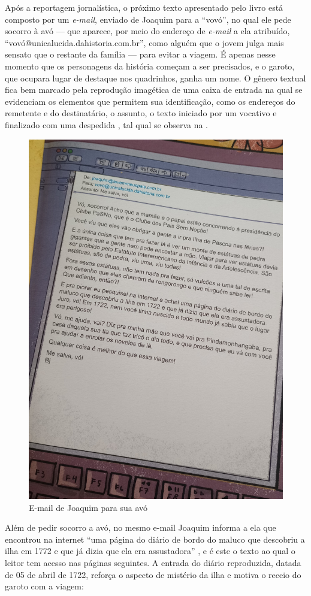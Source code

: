 \documentclass[portuguese]{textolivre}
\begin{document}
Após a reportagem jornalística, o próximo texto apresentado pelo livro está
composto por um \textit{e-mail}, enviado de Joaquim para a “vovó”, no qual ele
pede socorro à avó — que aparece, por meio do endereço de \textit{e-mail} a ela
atribuído, “vovó@unicalucida.dahistoria.com.br”, como alguém que o jovem julga
mais sensato que o restante da família — para evitar a viagem. É apenas nesse
momento que os personagens da história começam a ser precisados, e o garoto,
que ocupara lugar de destaque nos quadrinhos, ganha um nome. O gênero textual
fica bem marcado pela reprodução imagética de uma caixa de entrada na qual se
evidenciam os elementos que permitem sua identificação, como os endereços do
remetente e do destinatário, o assunto, o texto iniciado por um vocativo e
finalizado com uma despedida \cite[p.~110-112]{costa_dicionario_2012}, tal qual
se observa na .

\begin{figure}
    \centering
    \includegraphics[width=0.75\linewidth]{Fig2.jpeg}
    \caption{E-mail de Joaquim para sua avó}
    \label{fig2}
\end{figure}

Além de pedir socorro a avó, no mesmo e-mail Joaquim informa a ela que
encontrou na internet “uma página do diário de bordo do maluco que descobriu a
ilha em 1772 e que já dizia que ela era assustadora”
\cite[p.~13]{franco_queda_2018}, e é este o texto ao qual o leitor tem acesso
nas páginas seguintes. A entrada do diário reproduzida, datada de 05 de abril
de 1722, reforça o aspecto de mistério da ilha e motiva o receio do garoto com
a viagem:
\end{document}
